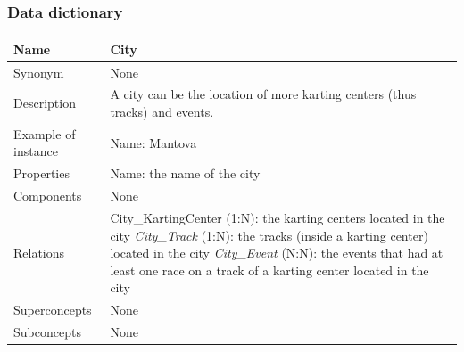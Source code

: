 \documentclass{beamer}
\begin{document}
\begin{frame}
\frametitle{Data dictionary}
\begin{table}
\tiny
\begin{tabular}{|p{2cm}|p{6cm}|}
\hline
Name & \textbf{City} \\
\hline
Synonym & None \\
\hline
Description & A city can be the location of more karting centers (thus tracks)
and events. \\
\hline
Example of instance & 
Name: Mantova \\
\hline
Properties & 
Name: the name of the city \\
\hline
Components & None \\
\hline
Relations &
City\_KartingCenter (1:N): the karting centers located in the city \newline
\textit{City\_Track} (1:N): the tracks (inside a karting center) located in the city \newline
\textit{City\_Event} (N:N): the events that had at least one race on a track of a karting center
located in the city \\
\hline
Superconcepts & None \\
\hline
Subconcepts & None \\
\hline
\end{tabular}
\end{table}
\end{frame}
\end{document}
